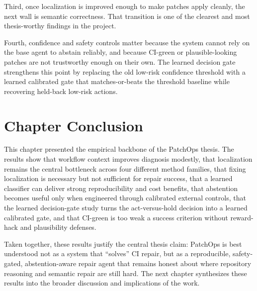 Third, once localization is improved enough to make patches apply cleanly, the next wall is semantic
correctness. That transition is one of the clearest and most thesis-worthy findings in the project.

Fourth, confidence and safety controls matter because the system cannot rely on the base agent to abstain
reliably, and because CI-green or plausible-looking patches are not trustworthy enough on their own.
The learned decision gate strengthens this point by replacing the old low-risk confidence threshold with a learned calibrated
gate that matches-or-beats the threshold baseline while recovering held-back low-risk actions.

\section{Chapter Conclusion}

This chapter presented the empirical backbone of the PatchOps thesis. The results show that workflow context
improves diagnosis modestly, that localization remains the central bottleneck across four different method
families, that fixing localization is necessary but not sufficient for repair success, that a learned classifier
can deliver strong reproducibility and cost benefits, that abstention becomes useful only when engineered
through calibrated external controls, that the learned decision-gate study turns the act-versus-hold decision into a learned calibrated
gate, and that CI-green is too weak a success criterion without reward-hack and plausibility defenses.

Taken together, these results justify the central thesis claim: PatchOps is best understood not as a system that
``solves'' CI repair, but as a reproducible, safety-gated, abstention-aware repair agent that remains honest
about where repository reasoning and semantic repair are still hard. The next chapter synthesizes these results
into the broader discussion and implications of the work.
